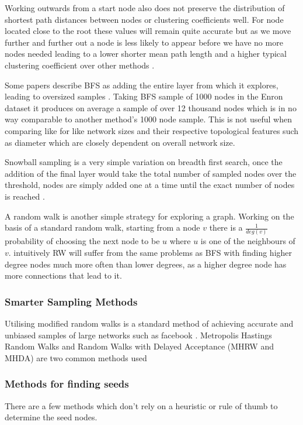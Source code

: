 \documentclass{article}
\begin{document}
Working outwards from a start node also does not preserve the distribution of shortest path distances between nodes or clustering coefficients well.
For node located close to the root these values will remain quite accurate but as we move further and further out a node is less likely to appear before we have no more nodes needed leading to a lower shorter mean path length and a higher typical clustering coefficient over other methods \cite{gjoka2010}.

Some papers describe BFS as adding the entire layer from which it explores, leading to oversized samples \cite{franks2014learning}.
Taking BFS sample of 1000 nodes in the Enron dataset it produces on average a sample of over 12 thousand nodes which is in no way comparable to another method's 1000 node sample.
This is not useful when comparing like for like network sizes and their respective topological features such as diameter which are closely dependent on overall network size.

Snowball sampling is a very simple variation on breadth first search,
once the addition of the final layer would take the total number of sampled nodes over the threshold, nodes are simply added one at a time until the exact number of nodes is reached \cite{franks2014learning}.

A random walk is another simple strategy for exploring a graph.
Working on the basis of a standard random walk, starting from a node $v$ there is a $\frac{1}{deg(v)}$ probability of choosing the next node to be $u$ where $u$ is one of the neighbours of $v$.
intuitively RW will suffer from the same problems as BFS with finding higher degree nodes much more often than lower degrees\cite{gjoka2010}, as a higher degree node has more connections that lead to it.

\subsubsection{Smarter Sampling Methods}
Utilising modified random walks is a standard method of achieving accurate and unbiased samples of large networks such as facebook \cite{gjoka2010}.
Metropolis Hastings Random Walks and Random Walks with Delayed Acceptance (MHRW and MHDA) are two common methods used \cite{gjoka2010, gjoka11practicalreco}

\subsubsection{Methods for finding seeds}
There are a few methods which don't rely on a heuristic or rule of thumb to determine the seed nodes.
\end{document}
